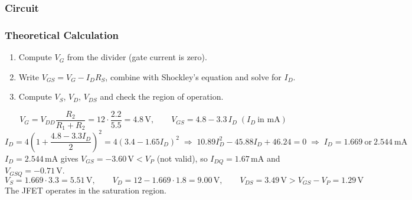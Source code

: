 

\subsubsection*{Circuit}

\subsubsection*{Theoretical Calculation}
\begin{enumerate}[itemsep=2pt]
  \item Compute $V_G$ from the divider (gate current is zero).
  \item Write $V_{GS} = V_G - I_D R_S$, combine with Shockley's equation and solve for $I_D$.
  \item Compute $V_S$, $V_D$, $V_{DS}$ and check the region of operation.
\end{enumerate}
\begin{solution}
\[
  V_G = V_{DD}\frac{R_2}{R_1+R_2} = 12\cdot\frac{2.2}{5.5} = 4.8\,\mathrm{V},\qquad V_{GS} = 4.8 - 3.3\,I_D \;(I_D\ \text{in mA})
\]
\[
  I_D = 4\left(1+\frac{4.8-3.3I_D}{2}\right)^2 = 4(3.4-1.65I_D)^2 \;\Rightarrow\; 10.89I_D^2 - 45.88I_D + 46.24 = 0
  \;\Rightarrow\; I_D = 1.669\ \text{or}\ 2.544\ \mathrm{mA}
\]
$I_D = 2.544$\,mA gives $V_{GS} = -3.60\,\mathrm{V} < V_P$ (not valid), so $I_{DQ} = 1.67$\,mA and $V_{GSQ} = -0.71$\,V.
\[
  V_S = 1.669\cdot3.3 = 5.51\,\mathrm{V},\qquad V_D = 12 - 1.669\cdot 1.8 = 9.00\,\mathrm{V},\qquad
  V_{DS} = 3.49\,\mathrm{V} > V_{GS}-V_P = 1.29\,\mathrm{V}
\]
The JFET operates in the saturation region.
\end{solution}

